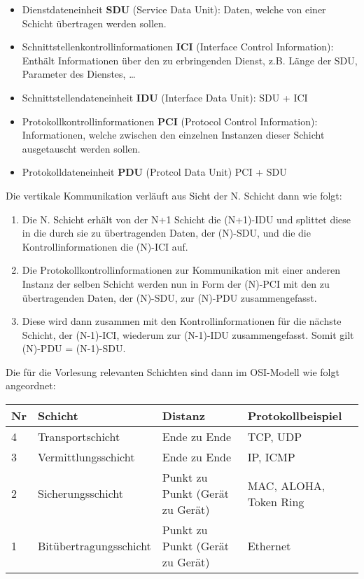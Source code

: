 \documentclass[a4paper,parskip=half*,DIV=15,fontsize=11pt]{scrartcl}
\begin{document}
\begin{itemize}
    \item Dienstdateneinheit \textbf{SDU} (Service Data Unit): Daten, welche von einer Schicht übertragen werden sollen.
    \item Schnittstellenkontrollinformationen \textbf{ICI} (Interface Control Information): Enthält Informationen über den zu erbringenden Dienst, z.B. Länge der SDU, Parameter des Dienstes, \dots
    \item Schnittstellendateneinheit \textbf{IDU} (Interface Data Unit): SDU + ICI
    \item Protokollkontrollinformationen \textbf{PCI} (Protocol Control Information): Informationen, welche zwischen den einzelnen Instanzen dieser Schicht ausgetauscht werden sollen.
    \item Protokolldateneinheit \textbf{PDU} (Protcol Data Unit) PCI + SDU
\end{itemize}

Die vertikale Kommunikation verläuft aus Sicht der N. Schicht dann wie folgt:

\begin{enumerate}
	\item Die N. Schicht erhält von der N+1 Schicht die (N+1)-IDU und splittet diese in die durch sie zu übertragenden Daten, der (N)-SDU, und die die Kontrollinformationen die (N)-ICI auf.
    \item Die Protokollkontrollinformationen zur Kommunikation mit einer anderen Instanz der selben Schicht werden nun in Form der (N)-PCI mit den zu übertragenden Daten, der (N)-SDU, zur (N)-PDU zusammengefasst.
    \item Diese wird dann zusammen mit den Kontrollinformationen für die nächste Schicht, der (N-1)-ICI, wiederum zur (N-1)-IDU zusammengefasst. Somit gilt (N)-PDU = (N-1)-SDU.
\end{enumerate}

Die für die Vorlesung relevanten Schichten sind dann im OSI-Modell wie folgt angeordnet:

\begin{tabular}{|l|l|l|l|}
\hline
\textbf{Nr} & \textbf{Schicht} & \textbf{Distanz} & \textbf{Protokollbeispiel} \\
\hline
4 & Transportschicht & Ende zu Ende & TCP, UDP \\
\hline
3 & Vermittlungsschicht & Ende zu Ende & IP, ICMP \\
\hline
2 & Sicherungsschicht & Punkt zu Punkt (Gerät zu Gerät) & MAC, ALOHA, Token Ring \\
\hline
1 & Bitübertragungsschicht & Punkt zu Punkt (Gerät zu Gerät) & Ethernet\\
\hline
\end{tabular}
\end{document}
